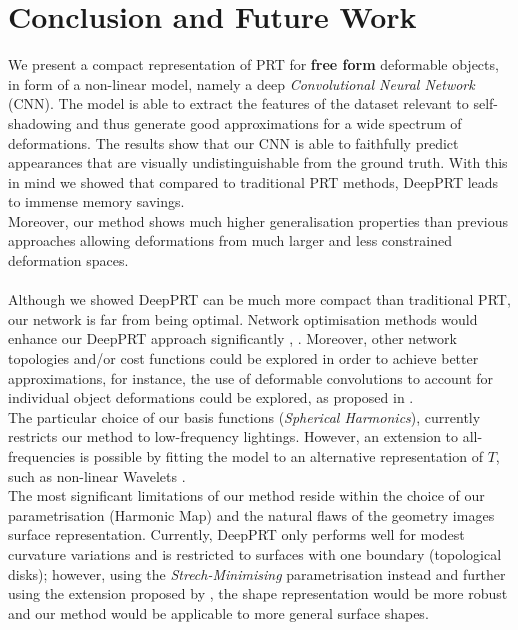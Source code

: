 \section{Conclusion and Future Work}
We present a compact representation of PRT for \textbf{free form} deformable objects, in form of a non-linear model, namely a deep \textit{Convolutional Neural Network} (CNN).  The model is able to extract the features of the dataset relevant to self-shadowing and thus generate good approximations for a wide spectrum of deformations. The results show that our CNN is able to faithfully predict appearances that are visually undistinguishable from the ground truth.  With this in mind we showed that compared to traditional PRT methods, DeepPRT leads to immense memory savings.
\\ 
Moreover, our method shows much higher generalisation properties than previous approaches allowing deformations from much larger and less constrained deformation spaces.\\
\\
Although we showed DeepPRT can be much more compact than traditional PRT, our network is far from being optimal. Network optimisation methods would enhance our DeepPRT approach significantly \cite{Survey_NN_Compression}, \cite{Deep_Compression}.
Moreover, other network topologies and/or cost functions could be explored in order to achieve  better approximations, for instance, the use of deformable convolutions \cite{DeformableCNN} to account for individual object deformations could be explored, as proposed in \cite{Deformable_UNet}.
\\
The particular choice of our basis functions (\textit{Spherical Harmonics}), currently restricts our method to low-frequency lightings. However, an extension to all-frequencies is possible by fitting the model to an alternative representation of $T$, such as non-linear Wavelets \cite{AllFrequencyPRT}.
\\
The most significant limitations of our method reside within the choice of our parametrisation (Harmonic Map) and the natural flaws of the geometry images surface representation.  Currently, DeepPRT only performs well for modest curvature variations and is restricted to surfaces with one boundary (topological disks); however, using the \textit{Strech-Minimising} parametrisation instead and further using the extension proposed by \cite{Spherical_Parametrization}, the shape representation would be more robust and our method would be applicable to more general surface shapes. \\
